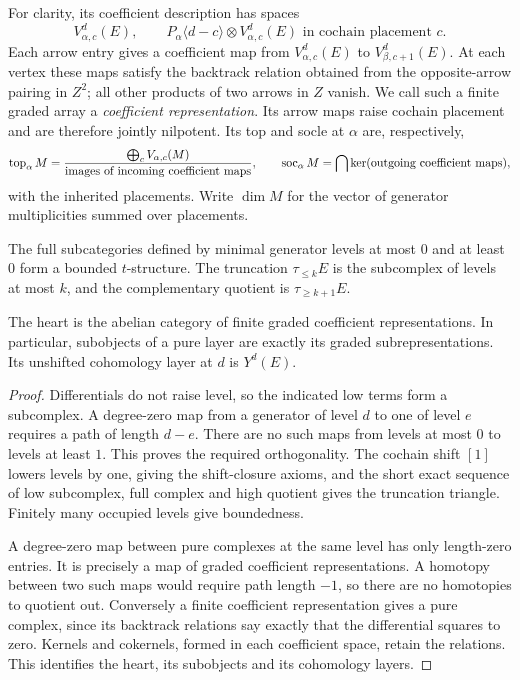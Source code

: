 For clarity, its coefficient description has spaces
\[
 V^d_{\alpha,c}(E),
 \qquad
 P_\alpha\langle d-c\rangle\otimes V^d_{\alpha,c}(E)
 \text{ in cochain placement }c.
\]
Each arrow entry gives a coefficient map from
$V^d_{\alpha,c}(E)$ to $V^d_{\beta,c+1}(E)$.  At each vertex these
maps satisfy the backtrack relation obtained from the opposite-arrow
pairing in $Z^2$; all other products of two arrows in $Z$ vanish.
We call such a finite graded array a \emph{coefficient representation}.
Its arrow maps raise cochain placement and are therefore jointly
nilpotent.  Its top and socle at $\alpha$ are, respectively,
\[
 \operatorname{top}_\alpha M=
 \frac{\bigoplus_c V_{\alpha,c}(M)}
      {\text{images of incoming coefficient maps}},
 \qquad
 \operatorname{soc}_\alpha M=
 \bigcap\ker(\text{outgoing coefficient maps}),
\]
with the inherited placements.  Write $\dim M$ for the vector of
generator multiplicities summed over placements.

\begin{lemma}\label{lay:structure}
The full subcategories defined by minimal generator levels at most $0$
and at least $0$ form a bounded $t$-structure.  The truncation
$\tau_{\le k}E$ is the subcomplex of levels at most $k$, and the
complementary quotient is $\tau_{\ge k+1}E$.

The heart is the abelian category of finite graded coefficient
representations.  In particular, subobjects of a pure layer are exactly
its graded subrepresentations.  Its unshifted cohomology layer at $d$
is $Y^d(E)$.
\end{lemma}

\begin{proof}
Differentials do not raise level, so the indicated low terms form a
subcomplex.  A degree-zero map from a generator of level $d$ to one of
level $e$ requires a path of length $d-e$.  There are no such maps from
levels at most $0$ to levels at least $1$.  This proves the required
orthogonality.  The cochain shift $[1]$ lowers levels by one, giving the
shift-closure axioms, and the short exact sequence of low subcomplex,
full complex and high quotient gives the truncation triangle.  Finitely
many occupied levels give boundedness.

A degree-zero map between pure complexes at the same level has only
length-zero entries.  It is precisely a map of graded coefficient
representations.  A homotopy between two such maps would require path
length $-1$, so there are no homotopies to quotient out.  Conversely a
finite coefficient representation gives a pure complex, since its
backtrack relations say exactly that the differential squares to zero.
Kernels and cokernels, formed in each coefficient space, retain the
relations.  This identifies the heart, its subobjects and its
cohomology layers.
\end{proof}

